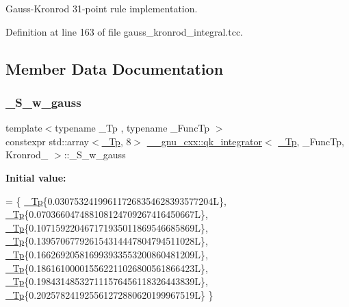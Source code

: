 Gauss-\/\+Kronrod 31-\/point rule implementation. 

Definition at line 163 of file gauss\+\_\+kronrod\+\_\+integral.\+tcc.



\subsection{Member Data Documentation}
\mbox{\label{struct____gnu__cxx_1_1qk__integrator_3_01__Tp_00_01__FuncTp_00_01Kronrod__31_01_4_a3c8884639349c6d5e61005e36dcdb35b}} 
\subsubsection{\texorpdfstring{\+\_\+\+S\+\_\+w\+\_\+gauss}{\_S\_w\_gauss}}
{\footnotesize\ttfamily template$<$typename \+\_\+\+Tp , typename \+\_\+\+Func\+Tp $>$ \\
constexpr std\+::array$<$\hyperlink{namespace____gnu__cxx_a3b19a9c800ca194374ef9172290f7d79}{\+\_\+\+Tp}, 8$>$ \hyperlink{class____gnu__cxx_1_1qk__integrator}{\+\_\+\+\_\+gnu\+\_\+cxx\+::qk\+\_\+integrator}$<$ \hyperlink{namespace____gnu__cxx_a3b19a9c800ca194374ef9172290f7d79}{\+\_\+\+Tp}, \+\_\+\+Func\+Tp, Kronrod\+\_ $>$\+::\+\_\+\+S\+\_\+w\+\_\+gauss\hspace{0.3cm}{\ttfamily [static]}}

{\bfseries Initial value\+:}
\begin{DoxyCode}
=
      \{
        \hyperlink{namespace____gnu__cxx_a3b19a9c800ca194374ef9172290f7d79}{\_Tp}\{0.030753241996117268354628393577204L\},
        \hyperlink{namespace____gnu__cxx_a3b19a9c800ca194374ef9172290f7d79}{\_Tp}\{0.070366047488108124709267416450667L\},
        \hyperlink{namespace____gnu__cxx_a3b19a9c800ca194374ef9172290f7d79}{\_Tp}\{0.107159220467171935011869546685869L\},
        \hyperlink{namespace____gnu__cxx_a3b19a9c800ca194374ef9172290f7d79}{\_Tp}\{0.139570677926154314447804794511028L\},
        \hyperlink{namespace____gnu__cxx_a3b19a9c800ca194374ef9172290f7d79}{\_Tp}\{0.166269205816993933553200860481209L\},
        \hyperlink{namespace____gnu__cxx_a3b19a9c800ca194374ef9172290f7d79}{\_Tp}\{0.186161000015562211026800561866423L\},
        \hyperlink{namespace____gnu__cxx_a3b19a9c800ca194374ef9172290f7d79}{\_Tp}\{0.198431485327111576456118326443839L\},
        \hyperlink{namespace____gnu__cxx_a3b19a9c800ca194374ef9172290f7d79}{\_Tp}\{0.202578241925561272880620199967519L\}
      \}
\end{DoxyCode}



